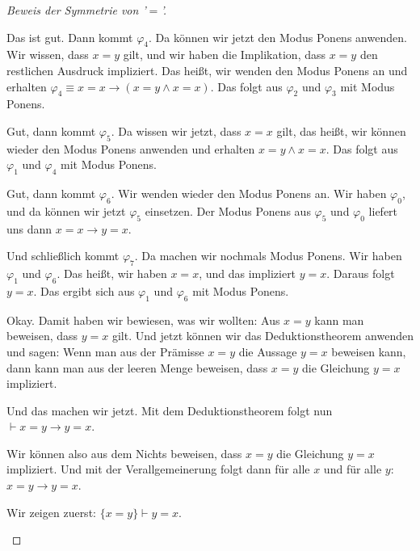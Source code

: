 \begin{proof}[Beweis der Symmetrie von '$=$']
\begin{spoken-clean}[00:58:32 - 01:03:07]
Das ist gut. Dann kommt $\varphi_4$. Da können wir jetzt den Modus Ponens anwenden. Wir wissen, dass $x=y$ gilt, und wir haben die Implikation, dass $x=y$ den restlichen Ausdruck impliziert. Das heißt, wir wenden den Modus Ponens an und erhalten $\varphi_4 \equiv x=x \to (x=y \land x=x)$. Das folgt aus $\varphi_2$ und $\varphi_3$ mit Modus Ponens.

Gut, dann kommt $\varphi_5$. Da wissen wir jetzt, dass $x=x$ gilt, das heißt, wir können wieder den Modus Ponens anwenden und erhalten $x=y \land x=x$. Das folgt aus $\varphi_1$ und $\varphi_4$ mit Modus Ponens.
\end{spoken-clean}

\begin{spoken-clean}[01:03:07 - 01:05:22]
Gut, dann kommt $\varphi_6$. Wir wenden wieder den Modus Ponens an. Wir haben $\varphi_0$, und da können wir jetzt $\varphi_5$ einsetzen. Der Modus Ponens aus $\varphi_5$ und $\varphi_0$ liefert uns dann $x=x \to y=x$. 

Und schließlich kommt $\varphi_7$. Da machen wir nochmals Modus Ponens. Wir haben $\varphi_1$ und $\varphi_6$. Das heißt, wir haben $x=x$, und das impliziert $y=x$. Daraus folgt $y=x$. Das ergibt sich aus $\varphi_1$ und $\varphi_6$ mit Modus Ponens.

Okay. Damit haben wir bewiesen, was wir wollten: Aus $x=y$ kann man beweisen, dass $y=x$ gilt. Und jetzt können wir das Deduktionstheorem anwenden und sagen: Wenn man aus der Prämisse $x=y$ die Aussage $y=x$ beweisen kann, dann kann man aus der leeren Menge beweisen, dass $x=y$ die Gleichung $y=x$ impliziert.
\end{spoken-clean}

\begin{spoken-clean}[01:05:22 - 01:06:15]
Und das machen wir jetzt. Mit dem Deduktionstheorem folgt nun $\vdash x=y \to y=x$.

Wir können also aus dem Nichts beweisen, dass $x=y$ die Gleichung $y=x$ impliziert. Und mit der Verallgemeinerung folgt dann für alle $x$ und für alle $y$: $x=y \to y=x$.
\end{spoken-clean}

\begin{math-stroke}
Wir zeigen zuerst: $\{x = y\} \vdash y = x$.


\end{math-stroke}
\end{proof}
